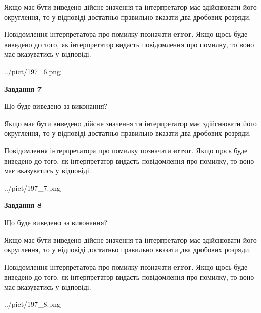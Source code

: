 \documentclass[12pt, ukrainian]{article}
\begin{document}
{\begin {Large}
Якщо має бути виведено дійсне значення та інтерпретатор має здійснювати його округлення, 
то у відповіді достатньо правильно вказати два дробових розряди.

Повідомлення інтерпретатора про помилку позначати \textbf{error}.
Якщо щось буде виведено до того, як інтерпретатор видасть повідомлення про помилку, 
то воно має вказуватись у відповіді. \par

\begin{center}
	{../pict/197_6.png}
\end{center}
\newpage

{\begin {center}\textbf{Завдання 7}\end {center}}\par
Що буде виведено за виконання? \par

Якщо має бути виведено дійсне значення та інтерпретатор має здійснювати його округлення, 
то у відповіді достатньо правильно вказати два дробових розряди.

Повідомлення інтерпретатора про помилку позначати \textbf{error}.
Якщо щось буде виведено до того, як інтерпретатор видасть повідомлення про помилку, 
то воно має вказуватись у відповіді. \par

\begin{center}
	{../pict/197_7.png}
\end{center}
\newpage

{\begin {center}\textbf{Завдання 8}\end {center}}\par
Що буде виведено за виконання? \par

Якщо має бути виведено дійсне значення та інтерпретатор має здійснювати його округлення, 
то у відповіді достатньо правильно вказати два дробових розряди.

Повідомлення інтерпретатора про помилку позначати \textbf{error}.
Якщо щось буде виведено до того, як інтерпретатор видасть повідомлення про помилку, 
то воно має вказуватись у відповіді. \par

\begin{center}
	{../pict/197_8.png}
\end{center}
\newpage


\end{Large}}
\end{document}
